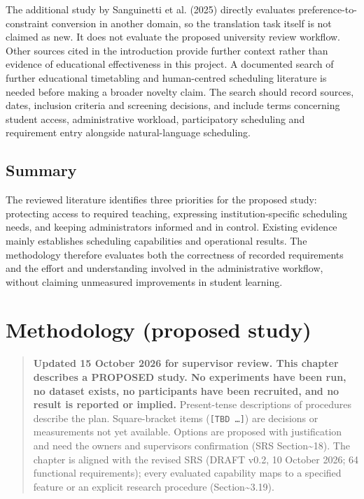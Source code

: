 \documentclass[
  11pt,a4paper,oneside]{report}
\begin{document}
The additional study by Sanguinetti et al. (2025) directly evaluates preference-to-constraint conversion in another domain, so the translation task itself is not claimed as new. It does not evaluate the proposed university review workflow. Other sources cited in the introduction provide further context rather than evidence of educational effectiveness in this project. A documented search of further educational timetabling and human-centred scheduling literature is needed before making a broader novelty claim. The search should record sources, dates, inclusion criteria and screening decisions, and include terms concerning student access, administrative workload, participatory scheduling and requirement entry alongside natural-language scheduling.

\section{Summary}
The reviewed literature identifies three priorities for the proposed study: protecting access to required teaching, expressing institution-specific scheduling needs, and keeping administrators informed and in control. Existing evidence mainly establishes scheduling capabilities and operational results. The methodology therefore evaluates both the correctness of recorded requirements and the effort and understanding involved in the administrative workflow, without claiming unmeasured improvements in student learning.

\hypertarget{methodology-proposed-study}{%
\chapter{Methodology (proposed
study)}\label{methodology-proposed-study}}

\begin{quote}
\textbf{Updated 15 October 2026 for supervisor review. This chapter describes a
PROPOSED study. No experiments have been run, no dataset exists, no
participants have been recruited, and no result is reported or implied.}
Present-tense descriptions of procedures describe the plan.
Square-bracket items (\texttt{{[}TBD\ …{]}}) are decisions or
measurements not yet available. Options are proposed with justification
and need the owner\textquotesingle s and supervisor\textquotesingle s
confirmation (SRS Section\textasciitilde18). The chapter is aligned with
the revised SRS (DRAFT v0.2, 10 October 2026; 64 functional requirements); every evaluated capability maps to a specified
feature or an explicit research procedure (Section\textasciitilde3.19).
\end{quote}
\end{document}
